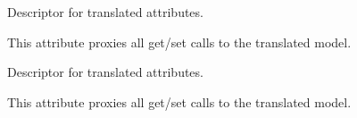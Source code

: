 \documentclass[letterpaper,10pt,english]{sphinxmanual}
\begin{document}
\begin{fulllineitems}
\begin{fulllineitems}
\label{\detokenize{index:core.models.CampingInfo.welcome_end}}
\pysigstartsignatures
\pysigline
{}
\pysigstopsignatures
\sphinxAtStartPar
Descriptor for translated attributes.

\sphinxAtStartPar
This attribute proxies all get/set calls to the translated model.

\end{fulllineitems}


\begin{fulllineitems}
\label{\detokenize{index:core.models.CampingInfo.welcome_start}}
\pysigstartsignatures
\pysigline
{}
\pysigstopsignatures
\sphinxAtStartPar
Descriptor for translated attributes.

\sphinxAtStartPar
This attribute proxies all get/set calls to the translated model.

\end{fulllineitems}


\end{fulllineitems}

\end{document}
